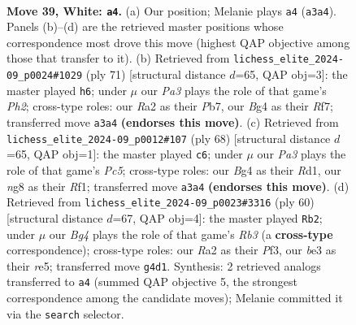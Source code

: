 \documentclass[11pt]{article}
\begin{document}
\clearpage

\begin{figure}[p]\centering
\begin{subfigure}{0.46\textwidth}\centering
\resizebox{\linewidth}{!}{%
\newchessgame
\chessboard[
  setfen={r5nr/p6p/5k2/8/6B1/PPp1b1BP/R1P3P1/1R5K w - - 2 39},
  showmover=false,
  pgfstyle=straightmove, color=movearrow, markmove={a3-a4}
]}
\caption{}
\end{subfigure}\hfill
\begin{subfigure}{0.46\textwidth}\centering
\resizebox{\linewidth}{!}{%
\newchessgame
\chessboard[
  setfen={2k5/1pp2rpp/1b6/pP2R1B1/2P5/6P1/7P/4K3 b - - 0 36},
  showmover=false,
  pgfstyle=straightmove, color=movearrow, markmove={h7-h6}
]}
\caption{}
\end{subfigure}
\\[4pt]
\begin{subfigure}{0.46\textwidth}\centering
\resizebox{\linewidth}{!}{%
\newchessgame
\chessboard[
  setfen={r4n2/6k1/p4p2/2P1bB2/1p2P3/1P5P/P5P1/3R1RK1 w - - 0 35},
  showmover=false,
  pgfstyle=straightmove, color=movearrow, markmove={c5-c6}
]}
\caption{}
\end{subfigure}\hfill
\begin{subfigure}{0.46\textwidth}\centering
\resizebox{\linewidth}{!}{%
\newchessgame
\chessboard[
  setfen={k2r4/p6p/2p5/4rb2/8/1R3PP1/P4K1P/R4B2 w - - 0 31},
  showmover=false,
  pgfstyle=straightmove, color=movearrow, markmove={b3-b2}
]}
\caption{}
\end{subfigure}
\caption{\textbf{Move 39, White: \texttt{a4}.} (a) Our position; Melanie plays \texttt{a4} (\texttt{a3a4}). Panels (b)--(d) are the retrieved master positions whose correspondence most drove this move (highest QAP objective among those that transfer to it). (b) Retrieved from \texttt{lichess\_elite\_2024-09\_p0024\#1029} (ply 71) [structural distance $d$=65, QAP obj=3]: the master played \texttt{h6}; under $\mu$ our \emph{Pa3} plays the role of that game's \emph{Ph2}; cross-type roles: our \emph{R}a2 as their \emph{P}b7, our \emph{B}g4 as their \emph{R}f7; transferred move \texttt{a3a4} \textbf{(endorses this move)}. (c) Retrieved from \texttt{lichess\_elite\_2024-09\_p0012\#107} (ply 68) [structural distance $d$=65, QAP obj=1]: the master played \texttt{c6}; under $\mu$ our \emph{Pa3} plays the role of that game's \emph{Pc5}; cross-type roles: our \emph{B}g4 as their \emph{R}d1, our \emph{n}g8 as their \emph{R}f1; transferred move \texttt{a3a4} \textbf{(endorses this move)}. (d) Retrieved from \texttt{lichess\_elite\_2024-09\_p0023\#3316} (ply 60) [structural distance $d$=67, QAP obj=4]: the master played \texttt{Rb2}; under $\mu$ our \emph{Bg4} plays the role of that game's \emph{Rb3} (a \textbf{cross-type} correspondence); cross-type roles: our \emph{R}a2 as their \emph{P}f3, our \emph{b}e3 as their \emph{r}e5; transferred move \texttt{g4d1}. Synthesis: 2 retrieved analogs transferred to \texttt{a4} (summed QAP objective 5, the strongest correspondence among the candidate moves); Melanie committed it via the \texttt{search} selector.}
\label{fig:thought-m76}
\end{figure}
\end{document}
